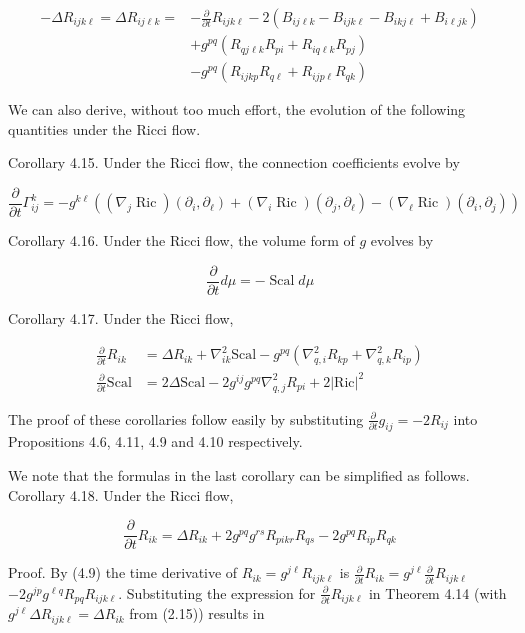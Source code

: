 \documentclass[10pt, letterpaper]{article}
\begin{document}
$$
\begin{aligned}
-\Delta R_{i j k \ell}=\Delta R_{i j \ell k}= & -\frac{\partial}{\partial t} R_{i j k \ell}-2\left(B_{i j \ell k}-B_{i j k \ell}-B_{i k j \ell}+B_{i \ell j k}\right) \\
& +g^{p q}\left(R_{q j \ell k} R_{p i}+R_{i q \ell k} R_{p j}\right) \\
& -g^{p q}\left(R_{i j k p} R_{q \ell}+R_{i j p \ell} R_{q k}\right)
\end{aligned}
$$

We can also derive, without too much effort, the evolution of the following quantities under the Ricci flow.

Corollary 4.15. Under the Ricci flow, the connection coefficients evolve by

$$
\frac{\partial}{\partial t} \Gamma_{i j}^{k}=-g^{k \ell}\left(\left(\nabla_{j} \operatorname{Ric}\right)\left(\partial_{i}, \partial_{\ell}\right)+\left(\nabla_{i} \operatorname{Ric}\right)\left(\partial_{j}, \partial_{\ell}\right)-\left(\nabla_{\ell} \operatorname{Ric}\right)\left(\partial_{i}, \partial_{j}\right)\right)
$$

Corollary 4.16. Under the Ricci flow, the volume form of $g$ evolves by

$$
\frac{\partial}{\partial t} d \mu=-\operatorname{Scal} d \mu
$$

Corollary 4.17. Under the Ricci flow,

$$
\begin{aligned}
\frac{\partial}{\partial t} R_{i k} & =\Delta R_{i k}+\nabla_{i k}^{2} \mathrm{Scal}-g^{p q}\left(\nabla_{q, i}^{2} R_{k p}+\nabla_{q, k}^{2} R_{i p}\right) \\
\frac{\partial}{\partial t} \mathrm{Scal} & =2 \Delta \mathrm{Scal}-2 g^{i j} g^{p q} \nabla_{q, j}^{2} R_{p i}+2|\mathrm{Ric}|^{2}
\end{aligned}
$$

The proof of these corollaries follow easily by substituting $\frac{\partial}{\partial t} g_{i j}=-2 R_{i j}$ into Propositions 4.6, 4.11, 4.9 and 4.10 respectively.

We note that the formulas in the last corollary can be simplified as follows.\\
Corollary 4.18. Under the Ricci flow,

$$
\frac{\partial}{\partial t} R_{i k}=\Delta R_{i k}+2 g^{p q} g^{r s} R_{p i k r} R_{q s}-2 g^{p q} R_{i p} R_{q k}
$$

Proof. By (4.9) the time derivative of $R_{i k}=g^{j \ell} R_{i j k \ell}$ is $\frac{\partial}{\partial t} R_{i k}=g^{j \ell} \frac{\partial}{\partial t} R_{i j k \ell}$ $-2 g^{j p} g^{\ell q} R_{p q} R_{i j k \ell}$. Substituting the expression for $\frac{\partial}{\partial t} R_{i j k \ell}$ in Theorem 4.14 (with $g^{j \ell} \Delta R_{i j k \ell}=\Delta R_{i k}$ from (2.15)) results in
\end{document}

